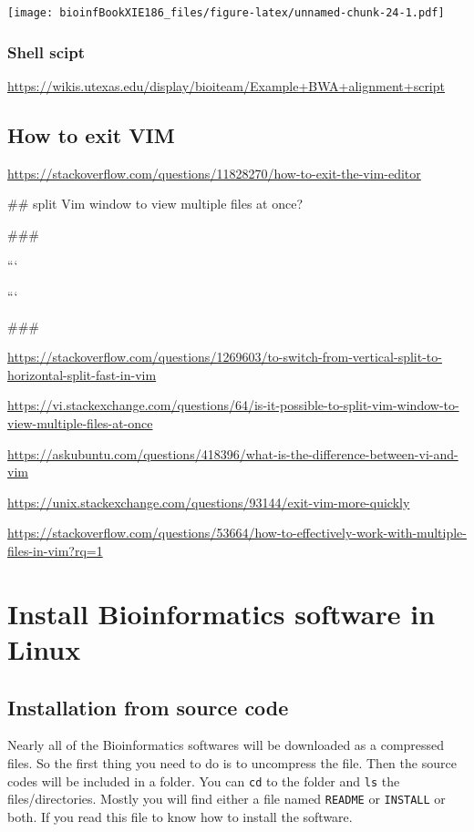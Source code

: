 \documentclass[]{book}
\theoremstyle{definition}
\theoremstyle{definition}
\theoremstyle{definition}
\theoremstyle{remark}
\begin{document}
\texttt{[image: bioinfBookXIE186\_files/figure-latex/unnamed-chunk-24-1.pdf]}

\subsection{Shell scipt}\label{shell-scipt}

\url{https://wikis.utexas.edu/display/bioiteam/Example+BWA+alignment+script}

\section{How to exit VIM}\label{how-to-exit-vim}

\url{https://stackoverflow.com/questions/11828270/how-to-exit-the-vim-editor}

\#\# split Vim window to view multiple files at once?

\#\#\#

```

```

\#\#\#

\url{https://stackoverflow.com/questions/1269603/to-switch-from-vertical-split-to-horizontal-split-fast-in-vim}

\url{https://vi.stackexchange.com/questions/64/is-it-possible-to-split-vim-window-to-view-multiple-files-at-once}

\url{https://askubuntu.com/questions/418396/what-is-the-difference-between-vi-and-vim}

\url{https://unix.stackexchange.com/questions/93144/exit-vim-more-quickly}

\url{https://stackoverflow.com/questions/53664/how-to-effectively-work-with-multiple-files-in-vim?rq=1}

\chapter{Install Bioinformatics software in
Linux}\label{install-bioinformatics-software-in-linux}

\section{Installation from source
code}\label{installation-from-source-code}

Nearly all of the Bioinformatics softwares will be downloaded as a
compressed files. So the first thing you need to do is to uncompress the
file. Then the source codes will be included in a folder. You can
\texttt{cd} to the folder and \texttt{ls} the files/directories. Mostly
you will find either a file named \texttt{README} or \texttt{INSTALL} or
both. If you read this file to know how to install the software.
\end{document}
